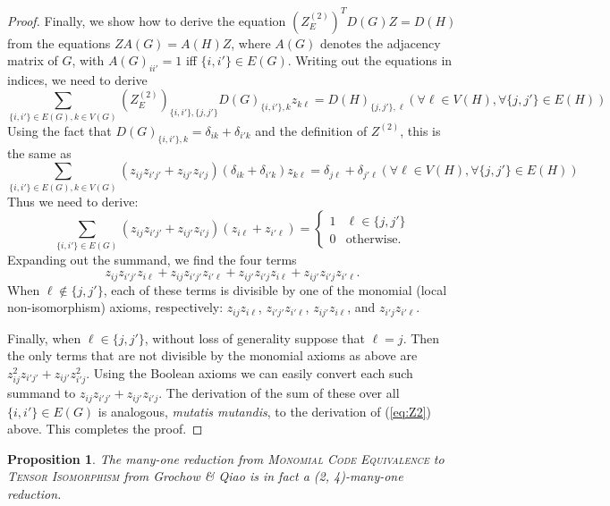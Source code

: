 \documentclass[10pt,a4paper]{article}
\newtheorem{proposition}[theorem]{Proposition}
\theoremstyle{definition}
\begin{document}
\begin{proof}
Finally, we show how to derive the equation $(Z^{(2)}_E)^T D(G) Z = D(H)$ from the equations $ZA(G) = A(H) Z$, where $A(G)$ denotes the adjacency matrix of $G$, with $A(G)_{ii'} = 1$ iff $\{i,i'\} \in E(G)$. Writing out the equations in indices, we need to derive
\[
\sum_{\{i,i'\} \in E(G),k \in V(G)} \left(Z^{(2)}_{E}\right)_{\{i,i'\},\{j,j'\}} D(G)_{\{i,i'\}, k} z_{k \ell} = D(H)_{\{j,j'\},\ell} (\forall \ell \in V(H), \forall \{j,j'\} \in E(H))
\]
Using the fact that $D(G)_{\{i,i'\},k} = \delta_{ik} + \delta_{i'k}$ and the definition of $Z^{(2)}$, this is the same as
\[
\sum_{\{i,i'\} \in E(G),k \in V(G)} \left(z_{ij} z_{i'j'} + z_{ij'} z_{i'j} \right) (\delta_{ik} + \delta_{i'k}) z_{k \ell} = \delta_{j\ell} + \delta_{j'\ell} (\forall \ell \in V(H), \forall \{j,j'\} \in E(H))
\]
Thus we need to derive:
\[
\sum_{\{i,i'\} \in E(G)} \left(z_{ij} z_{i'j'} + z_{ij'} z_{i'j} \right) (z_{i \ell}  + z_{i' \ell})= \begin{cases}
1 & \ell \in \{j,j'\} \\
0 & \text{otherwise}.
\end{cases}
\]
Expanding out the summand, we find the four terms
\[
z_{ij} z_{i'j'} z_{i\ell} + z_{ij} z_{i'j'} z_{i' \ell} + z_{ij'} z_{i'j} z_{i\ell} + z_{ij'} z_{i'j} z_{i'\ell}.
\]
When $\ell \notin \{j,j'\}$, each of these terms is divisible by one of the monomial (local non-isomorphism) axioms, respectively: $z_{ij} z_{i\ell}$, $z_{i'j'} z_{i'\ell}$, $z_{ij'} z_{i\ell}$, and $z_{i'j} z_{i'\ell}$.

Finally, when $\ell \in \{j,j'\}$, without loss of generality suppose that $\ell = j$. Then the only terms that are not divisible by the monomial axioms as above are $z_{ij}^2 z_{i'j'} + z_{ij'} z_{i'j}^2$. Using the Boolean axioms we can easily convert each such summand to $z_{ij} z_{i'j'} + z_{ij'} z_{i'j}$. The derivation of the sum of these over all $\{i,i'\} \in E(G)$ is analogous, \emph{mutatis mutandis}, to the derivation of (\ref{eq:Z2}) above. This completes the proof.
\end{proof}


\begin{proposition} \label{prop:MonTI}
The many-one reduction from \textsc{Monomial Code Equivalence} to \textsc{Tensor Isomorphism} from Grochow \& Qiao \cite{GQ2} is in fact a (2, 4)-many-one reduction.
\end{proposition}
\end{document}
